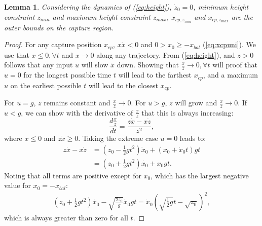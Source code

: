 \documentclass[letterpaper, 10 pt, conference]{ieeeconf}  %
\newcommand{\zmin}{z_{min}}
\newcommand{\zmax}{z_{max}}
\newtheorem{lem}{Lemma}
\begin{document}
\begin{lem}\label{lem:regionz}
Considering the dynamics of (\ref{eq:height}), $\dot{z}_0=0$, minimum height constraint $\zmin$ and maximum height constraint $\zmax$, $x_{cp,\zmin}$ and $x_{cp,\zmax}$ are the outer bounds on the capture region.
\end{lem}
\begin{proof}
For any capture position $x_{cp}$, $x\dot{x}<0$ \cite{koolen2016balance} and $0>x_0\geq-x_{bal}$ (\ref{eq:xcpuni}). 
We use that $x \leq 0, \forall t$ and $x\rightarrow 0$ along any trajectory. From (\ref{eq:height}), and $z>0$ follows that any input $u$ will slow $\dot{x}$ down. Showing that $\frac{x}{z}\rightarrow 0, \forall t$ will proof that $u=0$ for the longest possible time $t$ will lead to the farthest $x_{cp}$, and a maximum $u$ on the earliest possible $t$ will lead to the closest $x_{cp}$. 

For $u=g$, $z$ remains constant and $\frac{x}{z}\rightarrow 0$. For $u>g$, $z$ will grow and $\frac{x}{z}\rightarrow 0$. If $u<g$, we can show with the derivative of $\frac{x}{z}$ that this is always increasing:
\begin{equation}
\frac{d\frac{x}{z}}{dt}= \frac{z\dot{x}-x\dot{z}}{z^2},
\end{equation}
where $x \leq 0$ and $z \dot{x} \geq 0$. Taking the extreme case $u=0$ leads to:
\begin{align}
	z\dot{x}-x\dot{z} &= (z_0 - \frac{1}{2}gt^2)\dot{x}_0 + (x_0 + \dot{x}_0 t)gt\\
	&= (z_0 +\frac{1}{2}gt^2)\dot{x_0} + x_0gt.
\end{align}
Noting that all terms are positive except for $x_0$, which has the largest negative value for $x_0=-x_{bal}$:
\begin{align}
	(z_0 +\frac{1}{2}gt^2)\dot{x_0} - \sqrt{\frac{2z_0}{g}}\dot{x}_0gt = \dot{x}_0(\sqrt{\frac{1}{2}g}t - \sqrt{z_0})^2,
\end{align}
which is always greater than zero for all $t$.
\end{proof}
\end{document}
